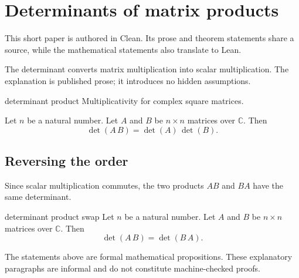 \section{Determinants of matrix products}
This short paper is authored in Clean. Its prose and theorem statements
share a source, while the mathematical statements also translate to Lean.

The determinant converts matrix multiplication into scalar multiplication.
The explanation is published prose; it introduces no hidden assumptions.
\par

\begin{cleanresult}{determinant product}
Multiplicativity for complex square matrices.
\par
Let $n$ be a natural number.
Let $A$ and $B$ be $n\times n$ matrices over $\mathbb{C}$.
Then \[\det(A \, B) = \det(A) \, \det(B).\]
\end{cleanresult}

\subsection{Reversing the order}
Since scalar multiplication commutes, the two products $AB$ and $BA$
have the same determinant.

\begin{cleanresult}{determinant product swap}
Let $n$ be a natural number.
Let $A$ and $B$ be $n\times n$ matrices over $\mathbb{C}$.
Then \[\det(A \, B) = \det(B \, A).\]
\end{cleanresult}

The statements above are formal mathematical propositions. These explanatory
paragraphs are informal and do not constitute machine-checked proofs.
\par

